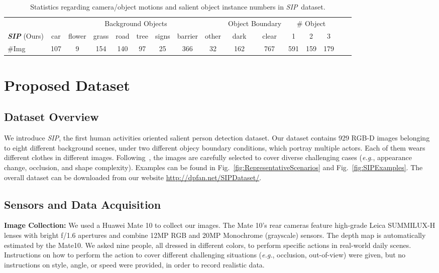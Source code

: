 \documentclass[journal]{IEEEtran}
\def\eg{\emph{e.g.}}
\newcommand{\figref}[1]{Fig.~\ref{#1}}
\newcommand{\fdp}[1]{#1}
\newcommand{\supp}[1]{\textcolor{magenta}{#1}}
\def\ourdataset{\textit{SIP}}
\begin{document}
\begin{table*}[t!]
  \centering
\small
  \renewcommand{\arraystretch}{1.0}
  \renewcommand{\tabcolsep}{2.6mm}
\caption{\small Statistics regarding camera/object motions and salient object instance numbers in \emph{SIP}~dataset.}\label{tab:Pattern}
  \begin{tabular}{l||cccccccc||cc||ccccc}
  \hline\toprule
    & \multicolumn{8}{c||}{Background Objects}&\multicolumn{2}{c||}{Object Boundary}&\multicolumn{3}{c}{\# Object}\\
    \multirow{-2}{*}{\textbf{\ourdataset} (Ours)}& car & flower & grass & road & tree & signs  & barrier & other & dark & clear & 1 & 2 & 3\\
\hline
    \#Img  & 107 & 9 & 154 & 140 & 97 & 25 & 366 & 32 & 162 & 767 & 591 & 159 & 179 \\
  \bottomrule
  \hline
  \end{tabular}
\end{table*}


\section{Proposed Dataset}\label{sec:SIPdataset}
\subsection{Dataset Overview}
We introduce \emph{SIP}, the first human activities oriented salient
person detection dataset. Our dataset contains 929 RGB-D images belonging to
\fdp{eight} different background scenes, \fdp{under two} different objecy boundary conditions,
\fdp{which portray} multiple actors. Each of them wears different clothes in
different images.
Following~\cite{fan2018salient}, the images are carefully selected to cover diverse
challenging cases (\eg, appearance change, occlusion, and shape complexity).
Examples can be found in \figref{fig:RepresentativeScenarios} and \figref{fig:SIPExamples}. The overall dataset
can be downloaded from our website \supp{\url{http://dpfan.net/SIPDataset/}}.



\subsection{Sensors and Data Acquisition}

\textbf{Image Collection:} We \fdp{used a} Huawei Mate 10 to collect our images.
The Mate 10's rear cameras feature high-grade Leica SUMMILUX-H lenses with bright
f/1.6 apertures
and combine 12MP RGB and 20MP Monochrome (grayscale) sensors.
The depth map is automatically estimated by the Mate10.
We asked nine people, all dressed in different colors,
to perform \fdp{specific} actions in real-world daily scenes.
Instructions on how to perform the action to cover different challenging situations
(\eg, occlusion, out-of-view) were given, \fdp{but} no instructions \fdp{on} style,
angle, or speed were provided, \fdp{in order to} record realistic data.
\end{document}
